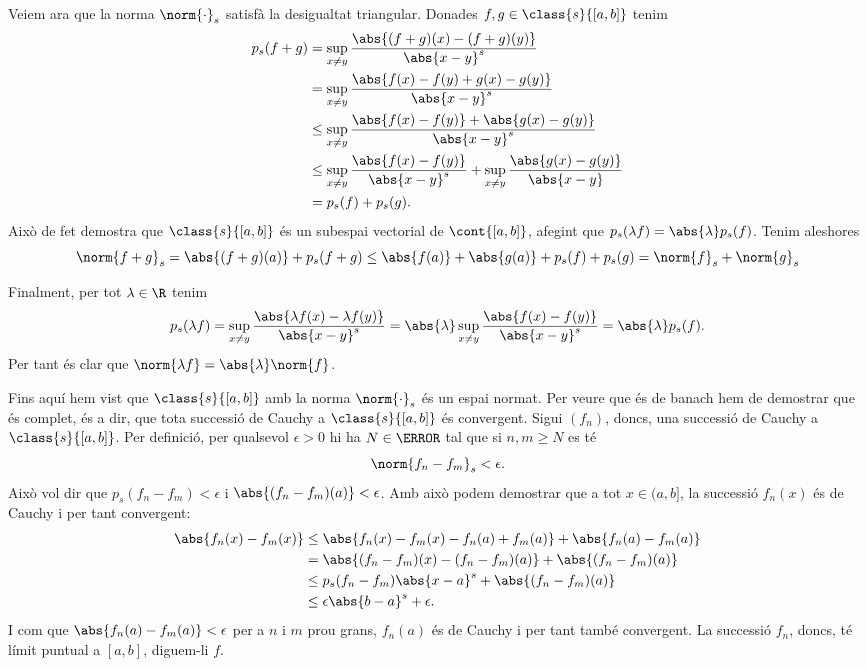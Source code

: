 \documentclass[12pt]{article}
\begin{document}
Veiem ara que la norma \( \norm{\cdot}_s \) satisfà la desigualtat triangular. Donades \(
f, g \in \class{s}{[a,b]} \) tenim
\begin{align*}
	p_s(f + g) & = \sup_{x \neq y} \frac{\abs{(f+g)(x) - (f+g)(y)}}{\abs{x-y}^s} \\
						 & = \sup_{x \neq y} \frac{\abs{f(x) - f(y) + g(x) - g(y)}}{\abs{x-y}^s} \\
						 & \leq \sup_{x \neq y} \frac{\abs{f(x) - f(y)} + \abs{g(x) - g(y)}}{\abs{x-y}^s} \\
						 & \leq \sup_{x \neq y} \frac{\abs{f(x) - f(y)}}{\abs{x-y}^s} + \sup_{x \neq
					 y} \frac{\abs{g(x) - g(y)}}{\abs{x-y}} \\
					 	 & = p_s(f) + p_s(g).
\end{align*}
Això de fet demostra que \( \class{s}{[a,b]} \) és un subespai vectorial de \(
\cont{[a,b]} \), afegint que \( p_s(\lambda f) = \abs{\lambda}p_s(f) \). Tenim aleshores
\begin{equation*}
	\norm{f+g}_s = \abs{(f+g)(a)} + p_s(f+g) \leq \abs{f(a)} + \abs{g(a)} + p_s(f) + p_s(g)
	= \norm{f}_s + \norm{g}_s
\end{equation*}

Finalment, per tot \( \lambda \in \R \) tenim
\begin{equation*}
	p_s(\lambda f) = \sup_{x \neq y} \frac{\abs{\lambda f(x) - \lambda f(y)}}{\abs{x - y}^s}
	= \abs{\lambda}\sup_{x \neq y} \frac{\abs{ f(x) -  f(y)}}{\abs{x - y}^s} =
	\abs{\lambda}p_s(f).
\end{equation*}
Per tant és clar que \( \norm{\lambda f} = \abs{\lambda}\norm{f} \).

Fins aquí hem vist que \( \class{s}{[a,b]} \) amb la norma \( \norm{\cdot}_s \)	és un
espai normat. Per veure que és de banach hem de demostrar que és complet, és a dir, que
tota successió de Cauchy a \( \class{s}{[a,b]} \) és convergent. Sigui \( (f_n) \), doncs,
una successió de Cauchy a \( \class{s}{[a,b]} \). Per definició, per qualsevol \( \epsilon
> 0 \) hi ha \( N \in \N \) tal que si \( n, m \geq N \) es té
\begin{equation*}
	\norm{f_n - f_m}_s < \epsilon.
\end{equation*}
Això vol dir que \( p_s(f_n - f_m) < \epsilon \) i \( \abs{(f_n - f_m)(a)} < \epsilon \).
Amb això podem demostrar que a tot \( x \in (a,b] \), la successió \( f_n(x) \) és de
Cauchy i per tant convergent:
\begin{align*}
	\abs{f_n(x) - f_m(x)} & \leq \abs{f_n(x) - f_m(x) - f_n(a) + f_m(a)} + \abs{f_n(a) -
	f_m(a)} \\
												& = \abs{(f_n - f_m)(x) - (f_n - f_m)(a)} + \abs{(f_n - f_m)(a)}
												\\
												& \leq p_s(f_n - f_m)\abs{x - a}^s + \abs{(f_n - f_m)(a)} \\
												& \leq \epsilon \abs{b - a}^s + \epsilon.
\end{align*}
I com que \( \abs{f_n(a) - f_m(a)} < \epsilon \) per a \( n \) i \( m \) prou grans, \(
f_n(a) \) és de Cauchy i per tant també convergent. La successió \( f_n \), doncs, té
límit puntual a \( [a,b] \), diguem-li \( f \). 
\end{document}
